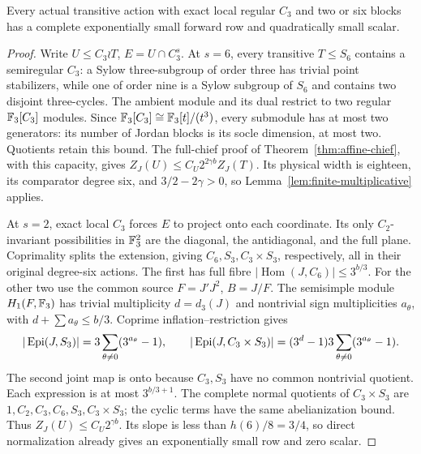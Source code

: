 \begin{proposition}\label{prop:bounded-c3}
Every actual transitive action with exact local regular $C_3$ and
two or six blocks has a complete exponentially small forward row
and quadratically small scalar.
\end{proposition}
\begin{proof}
Write $U\leq C_3\wr T$, $E=U\cap C_3^s$. At $s=6$, every
transitive $T\leq S_6$ contains a semiregular $C_3$: a Sylow
three-subgroup of order three has trivial point stabilizers, while
one of order nine is a Sylow subgroup of $S_6$ and contains two
disjoint three-cycles. The ambient module and its dual restrict to
two regular $\mathbb F_3[C_3]$ modules. Since
$\mathbb F_3[C_3]\cong\mathbb F_3[t]/(t^3)$, every submodule has at most two
generators: its number of Jordan blocks is its socle dimension,
at most two. Quotients retain this bound.
The full-chief proof of Theorem~\ref{thm:affine-chief}, with this
capacity, gives $Z_J(U)\leq C_U2^{2\gamma b}Z_J(T)$.
Its physical width is eighteen, its comparator degree six, and
$3/2-2\gamma>0$, so Lemma~\ref{lem:finite-multiplicative} applies.

At $s=2$, exact local $C_3$ forces $E$ to project onto each
coordinate. Its only $C_2$-invariant possibilities in $\mathbb F_3^2$ are
the diagonal, the antidiagonal, and the full plane. Coprimality
splits the extension, giving $C_6,S_3,C_3\times S_3$, respectively,
all in their original degree-six actions. The first has full fibre
$|\operatorname{Hom}(J,C_6)|\leq3^{b/3}$. For the other two use
the common source $F=J'J^2$, $B=J/F$. The semisimple module
$H_1(F,\mathbb F_3)$ has trivial multiplicity $d=d_3(J)$ and nontrivial
sign multiplicities $a_\theta$, with
$d+\sum a_\theta\leq b/3$. Coprime inflation--restriction gives
\[
 |\operatorname{Epi}(J,S_3)|=3\sum_{\theta\ne0}(3^{a_\theta}-1),\qquad
 |\operatorname{Epi}(J,C_3\times S_3)|
   =(3^d-1)3\sum_{\theta\ne0}(3^{a_\theta}-1).
\]
The second joint map is onto because $C_3,S_3$ have no common
nontrivial quotient. Each expression is at most $3^{b/3+1}$.
The complete normal quotients of $C_3\times S_3$ are
$1,C_2,C_3,C_6,S_3,C_3\times S_3$; the cyclic terms have the same
abelianization bound. Thus $Z_J(U)\leq C_U2^{\gamma b}$.
Its slope is less than $h(6)/8=3/4$, so direct normalization
already gives an exponentially small row and zero scalar.
\end{proof}

